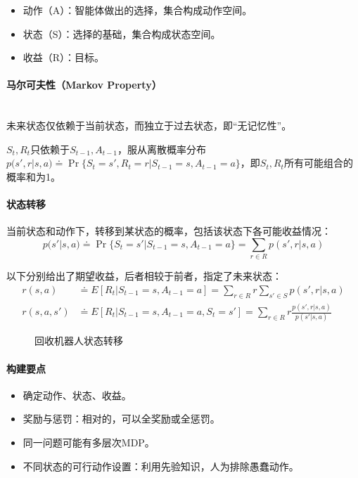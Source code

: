 \documentclass[
12pt, %
a4paper, 
oneside, %
headinclude,footinclude, %
]{scrartcl}
\begin{document}
\begin{itemize}
\item 动作（A）：智能体做出的选择，集合构成动作空间。
\item 状态（S）：选择的基础，集合构成状态空间。
\item 收益（R）：目标。
\end{itemize}
\paragraph{马尔可夫性（Markov Property）}~\\

未来状态仅依赖于当前状态，而独立于过去状态，即“无记忆性”。

$ S_t,R_t $只依赖于$ S_{t - 1},A_{t - 1} $，服从离散概率分布$ p(s', r|s, a) \doteq \Pr\{S_t = s', R_t = r|S_{t - 1} = s, A_{t - 1} = a\} $，即$ S_t,R_t $所有可能组合的概率和为1。
\paragraph{状态转移}
当前状态和动作下，转移到某状态的概率，包括该状态下各可能收益情况：
$$
p(s'|s, a) \doteq \Pr\{S_t = s'|S_{t - 1} = s, A_{t - 1} = a\} = \sum_{r \in R} p(s', r|s, a)
$$

以下分别给出了期望收益，后者相较于前者，指定了未来状态：
\begin{align*}
r(s, a) &\doteq E[R_t|S_{t - 1} = s, A_{t - 1} = a] = \sum_{r \in R} r \sum_{s' \in S} p(s', r|s, a) \\
r(s, a, s') &\doteq E[R_t|S_{t - 1} = s, A_{t - 1} = a, S_t = s'] = \sum_{r \in R} r \frac{p(s', r|s, a)}{p(s'|s, a)}  
\end{align*}

\begin{figure}[H]
\centering
{} \quad
{}
\caption[回收机器人状态转移]{回收机器人状态转移}
\end{figure}
\paragraph{构建要点}
\begin{itemize}
\item 确定动作、状态、收益。
\item 奖励与惩罚：相对的，可以全奖励或全惩罚。
\item 同一问题可能有多层次MDP。
\item 不同状态的可行动作设置：利用先验知识，人为排除愚蠢动作。
\end{itemize}
\end{document}
